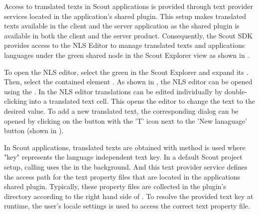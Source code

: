 \documentclass[a4paper,10pt,twoside]{book}
\begin{document}
Access to translated texts in Scout applications is provided through text provider services located in the application's shared plugin. 
This setup makes translated texts available in the client and the server application as the shared plugin is available in both the client and the server product. 
Consequently, the Scout SDK provides access to the NLS Editor to manage translated texts and applications languages under the green shared node in the Scout Explorer view as shown in .

To open the NLS editor, select the green  in the Scout Explorer and expand its .
Then, select the contained element .
As shown in , the NLS editor can be opened using the .
In the NLS editor translations can be edited individually by double-clicking into a translated text cell.
This opens the editor to change the text to the desired value.
To add a new translated text, the corresponding dialog can be opened by clicking on the button with the 'T' icon next to the 'New lanaguage' button (shown in ).

In Scout applications, translated texts are obtained with method  is used where "key" represents the language independent text key.
In a default Scout project setup, calling  uses the  in the background.
And this text provider service defines the access path for the text property files that are located in the applications shared plugin.
Typically, these property files are collected in the plugin's  directory according to the right hand side of . 
To resolve the provided text key at runtime, the user's locale settings is used to access the correct text property file.
\end{document}
